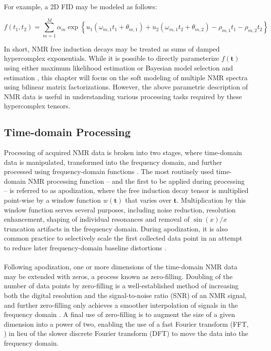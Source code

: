 \begin{doublespace}
For example, a 2D FID may be modeled as follows:

\begin{equation}
f(t_1, t_2) = \sum_{m=1}^M \alpha_m \exp\left\{
  u_1 (\omega_{m,1} t_1 + \theta_{m,1}) +
  u_2 (\omega_{m,1} t_2 + \theta_{m,2}) -
  \rho_{m,1} t_1 - \rho_{m,2} t_2
  \right\}
\end{equation}

In short, NMR free induction decays may be treated as sums of damped
hypercomplex exponentials. While it is possible to directly parameterize
$f(\mathbf{t})$ using either maximum likelihood estimation
\cite{chylla:jbnmr1995,chylla:jbnmr1998,chylla:anchem2011} or Bayesian
model selection and estimation
\cite{bretthorst:jmr1990a,
      bretthorst:jmr1990b,
      bretthorst:jmr1990c,
      chylla:jbnmr1993}, this chapter will focus on the soft modeling of
multiple NMR spectra using bilinear matrix factorizations. However, the above
parametric description of NMR data is useful in understanding various
processing tasks required by these hypercomplex tensors.
\end{doublespace}

\subsection{Time-domain Processing}

\begin{doublespace}
Processing of acquired NMR data is broken into two stages, where time-domain
data is manipulated, transformed into the frequency domain, and further
processed using frequency-domain functions \cite{hoch1996}.
The most routinely used time-domain NMR processing function -- and the first
to be applied during processing -- is referred to as apodization, where the
free induction decay tensor is multiplied point-wise by a window function
$w(\mathbf{t})$ that varies over $\mathbf{t}$. Multiplication by this window
function serves several purposes, including noise reduction, resolution
enhancement, shaping of individual resonances and removal of $\sin(x)/x$
truncation artifacts in the frequency domain. During apodization, it is also
common practice to selectively scale the first collected data point in an
attempt to reduce later frequency-domain baseline distortions
\cite{stoch:jmr2005,ebel:jmr2006}.
\\\\
Following apodization, one or more dimensions of the time-domain NMR data may
be extended with zeros, a process known as zero-filling. Doubling of the number
of data points by zero-filling is a well-established method of increasing both
the digital resolution and the signal-to-noise ratio (SNR) of an NMR signal,
and further zero-filling only achieves a smoother interpolation of signals in
the frequency domain \cite{ebel:jmr2006}. A final use of zero-filling is to
augment the size of a given dimension into a power of two, enabling the use of
a fast Fourier transform (FFT, \cite{cooley:mcomp1965}) in lieu of the slower
discrete Fourier transform (DFT) to move the data into the frequency domain.
\end{doublespace}


